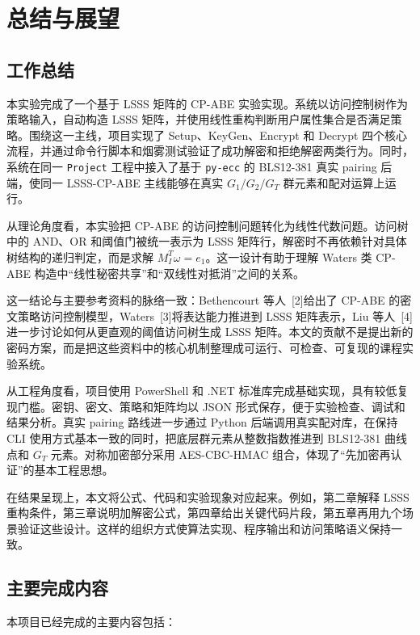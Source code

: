 \chapter{总结与展望}

\section{工作总结}

本实验完成了一个基于 LSSS 矩阵的 CP-ABE 实验实现。系统以访问控制树作为策略输入，自动构造 LSSS 矩阵，并使用线性重构判断用户属性集合是否满足策略。围绕这一主线，项目实现了 Setup、KeyGen、Encrypt 和 Decrypt 四个核心流程，并通过命令行脚本和烟雾测试验证了成功解密和拒绝解密两类行为。同时，系统在同一 \verb|Project| 工程中接入了基于 \verb|py-ecc| 的 BLS12-381 真实 pairing 后端，使同一 LSSS-CP-ABE 主线能够在真实 $G_1/G_2/G_T$ 群元素和配对运算上运行。

从理论角度看，本实验把 CP-ABE 的访问控制问题转化为线性代数问题。访问树中的 AND、OR 和阈值门被统一表示为 LSSS 矩阵行，解密时不再依赖针对具体树结构的递归判定，而是求解 $M_I^T\omega=e_1$。这一设计有助于理解 Waters 类 CP-ABE 构造中“线性秘密共享”和“双线性对抵消”之间的关系。

这一结论与主要参考资料的脉络一致：Bethencourt 等人~[2]给出了 CP-ABE 的密文策略访问控制模型，Waters~[3]将表达能力推进到 LSSS 矩阵表示，Liu 等人~[4]进一步讨论如何从更直观的阈值访问树生成 LSSS 矩阵。本文的贡献不是提出新的密码方案，而是把这些资料中的核心机制整理成可运行、可检查、可复现的课程实验系统。

从工程角度看，项目使用 PowerShell 和 .NET 标准库完成基础实现，具有较低复现门槛。密钥、密文、策略和矩阵均以 JSON 形式保存，便于实验检查、调试和结果分析。真实 pairing 路线进一步通过 Python 后端调用真实配对库，在保持 CLI 使用方式基本一致的同时，把底层群元素从整数指数推进到 BLS12-381 曲线点和 $G_T$ 元素。对称加密部分采用 AES-CBC-HMAC 组合，体现了“先加密再认证”的基本工程思想。

在结果呈现上，本文将公式、代码和实验现象对应起来。例如，第二章解释 LSSS 重构条件，第三章说明加解密公式，第四章给出关键代码片段，第五章再用九个场景验证这些设计。这样的组织方式使算法实现、程序输出和访问策略语义保持一致。

\section{主要完成内容}

本项目已经完成的主要内容包括：

